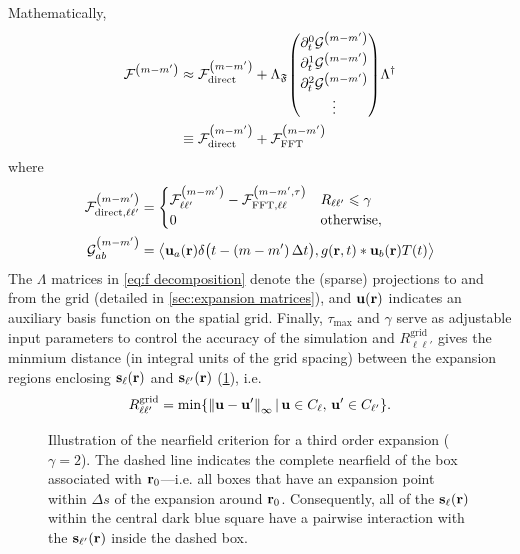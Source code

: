 Mathematically,
\begin{equation}
  \begin{aligned}
    \mathcal{F}^\qty(m - m') & \approx \mathcal{F}^\qty(m-m')_\text{direct} + \Lambda_\mathfrak{F} \mqty(\partial_t^0 \mathcal{G}^\qty(m-m') \\ \partial_t^1 \mathcal{G}^\qty(m-m') \\ \partial_t^2 \mathcal{G}^\qty(m-m') \\ \vdots) \Lambda^\dagger \\
                             & \equiv \mathcal{F}^\qty(m-m')_\text{direct} + \mathcal{F}^\qty(m-m')_\text{FFT}
    \end{aligned}
  \label{eq:f decomposition}
\end{equation}
where
\begin{subequations}
  \begin{align}
    \mathcal{F}^\qty(m-m')_{\text{direct},\ell\ell'} &= \begin{cases}
      \mathcal{F}^\qty(m-m')_{\ell\ell'}  - \mathcal{F}^\qty(m-m',\tau)_{\text{FFT},\ell\ell} & R_{\ell\ell'} \leqslant \gamma \\
      0 & \text{otherwise},
    \end{cases} \\
    \mathcal{G}^\qty(m-m')_{ab} &= \left< \vb{u}_a(\vb{r})\delta\qty\big(t - (m-m')\, \Delta t), g(\vb{r}, t) \ast \vb{u}_{b}(\vb{r})T(t) \right>
  \end{align}
  \label{eq:decomposition elements}
\end{subequations}
The $\Lambda$ matrices in \cref{eq:f decomposition} denote the (sparse) projections to and from the grid (detailed in \cref{sec:expansion matrices}), and $\vb{u}(\vb{r})$ indicates an auxiliary basis function on the spatial grid.
Finally, $\tau_\text{max}$ and $\gamma$ serve as adjustable input parameters to control the accuracy of the simulation and $R^\text{grid}_{\ell\ell'}$ gives the minmium distance (in integral units of the grid spacing) between the expansion regions enclosing $\vb{s}_\ell(\vb{r})$ and $\vb{s}_{\ell'}(\vb{r})$ (\cref{fig:nearfield criterion}), i.e.
\begin{equation}
  R^\text{grid}_{\ell\ell'} = \min\!\qty{\norm{\vb{u} - \vb{u}'}_\infty \, | \, \vb{u} \in C_\ell, \, \vb{u}' \in C_{\ell'}}.
\end{equation}

\begin{figure}
  \centering
  
  \caption{\label{fig:nearfield criterion}Illustration of the nearfield criterion for a third order expansion ($\gamma = 2$).
    The dashed line indicates the complete nearfield of the box associated with \textcolor{cbblue}{$\vb{r}_0$}---i.e. all boxes that have an expansion point within $\Delta s$ of the expansion around \textcolor{cbblue}{$\vb{r}_0$}.
    Consequently, all of the $\vb{s}_\ell(\vb{r})$ within the central dark blue square have a pairwise interaction with the $\vb{s}_{\ell'}(\vb{r})$ inside the dashed box.
  }
\end{figure}

